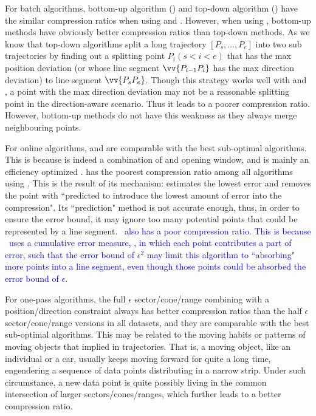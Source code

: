 For batch algorithms, bottom-up algorithm (\tpa) and top-down algorithm (\dpa) have the similar compression ratios when using \ped and \sed. However, when using \dad, bottom-up methods have obviously better compression ratios than top-down methods.  As we know that top-down algorithms split a long trajectory $[P_s, ..., P_e]$ into two sub trajectories by finding out a splitting point $P_i (s<i<e)$ that has the max position deviation (or whose line segment $\vv{P_{i-1}P_{i}}$ has the max direction deviation) to line segment $\vv{P_sP_{e}}$. Though this strategy works well with \ped and \sed, a point with the max direction deviation may not be a reasonable splitting point in the direction-aware scenario. Thus it leads to a poorer compression ratio. However, bottom-up methods do not have this weakness as they always merge neighbouring points.



For online algorithms, \bqsa and \opwa are comparable with the best sub-optimal algorithms. This is because \opwa is indeed a combination of \dpa and opening window, and \bqsa is mainly an efficiency optimized \opwa.
\squishe has the poorest compression ratio among all algorithms using \sed. This is the result of its mechanism: \squishe estimates the lowest \sed error and removes the point with ``predicted to introduce the lowest amount of error into the compression"\cite{Muckell:SQUISH}. Its ``prediction" method is not accurate enough, thus, in order to ensure the error bound, it may ignore too many potential points that could be represented by a line segment. \textcolor{blue}{\dagots~also has a poor compression ratio. This is because \dagots~uses a cumulative error measure, \lissed, in which each point contributes a part of error, such that the \lissed error bound of $\epsilon^2$ may limit this algorithm to ``absorbing" more points into a line segment, even though those points could be absorbed \wrt the  \sed error bound of $\epsilon$.}

For one-pass algorithms, the full $\epsilon$ sector/cone/range combining with a position/direction constraint always has better compression ratios than the half $\epsilon$ sector/cone/range versions in all datasets, and they are comparable with the best sub-optimal algorithms.
This may be related to the moving habits or patterns of moving objects that implied in trajectories.
That is, a moving object, like an individual or a car, usually keeps moving forward for quite a long time, engendering a sequence of data points distributing in a narrow strip. Under such circumstance, a new data point is quite possibly living in the common intersection of larger sectors/cones/ranges, which further leads to a better compression ratio. 

